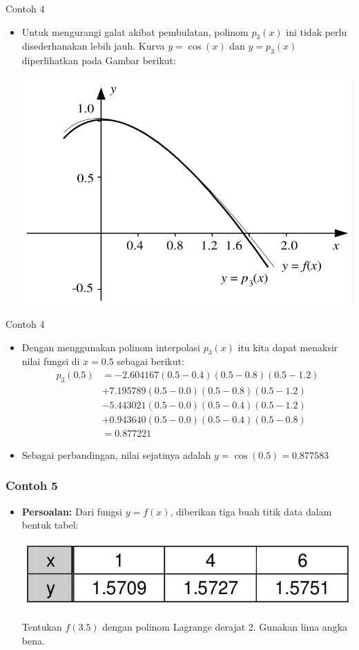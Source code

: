 \documentclass[pdflatex,compress,mathserif]{beamer}
\begin{document}
\begin{frame}{Contoh 4}
	\begin{itemize}
		\item Untuk mengurangi galat akibat pembulatan, polinom $ p_3(x) $ ini tidak perlu disederhanakan lebih jauh. Kurva $ y = \cos(x) $ dan $ y = p_3(x) $ diperlihatkan pada Gambar berikut:
		\begin{center}
			\includegraphics[width=0.7\linewidth]{img/img09}
		\end{center}
	\end{itemize}
\end{frame}

\begin{frame}{Contoh 4}
	\begin{itemize}
		\item Dengan menggunakan polinom interpolasi $ p_3 (x) $ itu kita dapat menaksir nilai fungsi di $ x = 0.5 $ sebagai berikut:
		\begin{align*}
			p_3(0.5) &= -2.604167(0.5 - 0.4)(0.5 - 0.8)(0.5 - 1.2) \\
			&+ 7.195789(0.5 - 0.0)(0.5 - 0.8)(0.5 - 1.2) \\
			&-5.443021(0.5 - 0.0)(0.5 - 0.4)(0.5 - 1.2) \\
			&+ 0.943640(0.5 - 0.0)(0.5 - 0.4)(0.5 - 0.8) \\
			&= 0.877221
		\end{align*}
		\item Sebagai perbandingan, nilai sejatinya adalah
		$ y = \cos(0.5) = 0.877583 $
	\end{itemize}
\end{frame}

\begin{frame}
	\frametitle{Contoh 5}
	\begin{itemize}
		\item \textbf{Persoalan:} Dari fungsi $ y = f(x) $, diberikan tiga buah titik data dalam bentuk tabel:
		\begin{center}
			\includegraphics[width=0.7\linewidth]{img/img10}
		\end{center}
		Tentukan $ f(3.5) $ dengan polinom Lagrange derajat 2. Gunakan lima angka bena.
	\end{itemize}
\end{frame}
\end{document}
